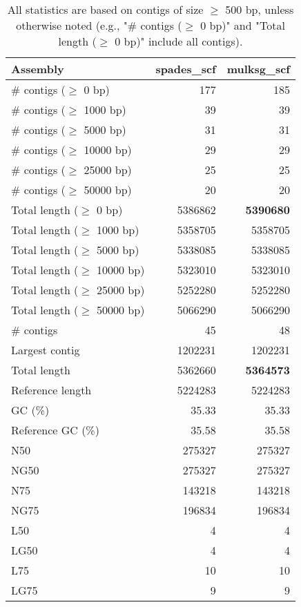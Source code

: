 \documentclass[12pt,a4paper]{article}
\begin{document}
\begin{table}[ht]
\begin{center}
\caption{All statistics are based on contigs of size $\geq$ 500 bp, unless otherwise noted (e.g., "\# contigs ($\geq$ 0 bp)" and "Total length ($\geq$ 0 bp)" include all contigs).}
\begin{tabular}{|l*{2}{|r}|}
\hline
Assembly & spades\_scf & mulksg\_scf \\ \hline
\# contigs ($\geq$ 0 bp) & 177 & 185 \\ \hline
\# contigs ($\geq$ 1000 bp) & 39 & 39 \\ \hline
\# contigs ($\geq$ 5000 bp) & 31 & 31 \\ \hline
\# contigs ($\geq$ 10000 bp) & 29 & 29 \\ \hline
\# contigs ($\geq$ 25000 bp) & 25 & 25 \\ \hline
\# contigs ($\geq$ 50000 bp) & 20 & 20 \\ \hline
Total length ($\geq$ 0 bp) & 5386862 & {\bf 5390680} \\ \hline
Total length ($\geq$ 1000 bp) & 5358705 & 5358705 \\ \hline
Total length ($\geq$ 5000 bp) & 5338085 & 5338085 \\ \hline
Total length ($\geq$ 10000 bp) & 5323010 & 5323010 \\ \hline
Total length ($\geq$ 25000 bp) & 5252280 & 5252280 \\ \hline
Total length ($\geq$ 50000 bp) & 5066290 & 5066290 \\ \hline
\# contigs & 45 & 48 \\ \hline
Largest contig & 1202231 & 1202231 \\ \hline
Total length & 5362660 & {\bf 5364573} \\ \hline
Reference length & 5224283 & 5224283 \\ \hline
GC (\%) & 35.33 & 35.33 \\ \hline
Reference GC (\%) & 35.58 & 35.58 \\ \hline
N50 & 275327 & 275327 \\ \hline
NG50 & 275327 & 275327 \\ \hline
N75 & 143218 & 143218 \\ \hline
NG75 & 196834 & 196834 \\ \hline
L50 & 4 & 4 \\ \hline
LG50 & 4 & 4 \\ \hline
L75 & 10 & 10 \\ \hline
LG75 & 9 & 9 \\ \hline

\end{tabular}
\end{center}
\end{table}
\end{document}
